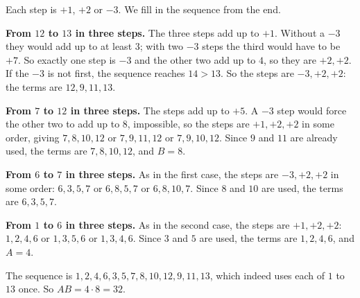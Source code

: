 Each step is $+1$, $+2$ or $-3$. We fill in the sequence from the end.

\textbf{From $12$ to $13$ in three steps.} The three steps add up to $+1$. Without a $-3$ they would add up to at least $3$; with two $-3$ steps the third would have to be $+7$. So exactly one step is $-3$ and the other two add up to $4$, so they are $+2,+2$. If the $-3$ is not first, the sequence reaches $14>13$. So the steps are $-3,+2,+2$: the terms are $12,9,11,13$.

\textbf{From $7$ to $12$ in three steps.} The steps add up to $+5$. A $-3$ step would force the other two to add up to $8$, impossible, so the steps are $+1,+2,+2$ in some order, giving $7,8,10,12$ or $7,9,11,12$ or $7,9,10,12$. Since $9$ and $11$ are already used, the terms are $7,8,10,12$, and $B=8$.

\textbf{From $6$ to $7$ in three steps.} As in the first case, the steps are $-3,+2,+2$ in some order: $6,3,5,7$ or $6,8,5,7$ or $6,8,10,7$. Since $8$ and $10$ are used, the terms are $6,3,5,7$.

\textbf{From $1$ to $6$ in three steps.} As in the second case, the steps are $+1,+2,+2$: $1,2,4,6$ or $1,3,5,6$ or $1,3,4,6$. Since $3$ and $5$ are used, the terms are $1,2,4,6$, and $A=4$.

The sequence is $1,2,4,6,3,5,7,8,10,12,9,11,13$, which indeed uses each of $1$ to $13$ once. So $AB=4\cdot8=\boxed{32}$.
